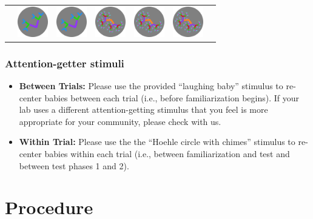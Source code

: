 \documentclass[
  letterpaper,
  DIV=11,
  numbers=noendperiod,
  oneside]{scrreprt}
\providecommand{\tightlist}{%
  \setlength{\itemsep}{0pt}\setlength{\parskip}{0pt}}
\begin{document}
\begin{longtable}[]{@{}lllllll@{}}
&
\includegraphics[width=\linewidth,height=0.52083in,keepaspectratio]{images/fractal-low.png}
&
\includegraphics[width=\linewidth,height=0.52083in,keepaspectratio]{images/fractal-low.png}
&
\includegraphics[width=\linewidth,height=0.52083in,keepaspectratio]{images/fractal-high.png}
&
\includegraphics[width=\linewidth,height=0.52083in,keepaspectratio]{images/fractal-high.png}
&
\includegraphics[width=\linewidth,height=0.52083in,keepaspectratio]{images/fractal-high.png} \\
\end{longtable}

\subsection{Attention-getter stimuli}\label{attention-getter-stimuli}

\begin{itemize}
\tightlist
\item
  \textbf{Between Trials:} Please use the provided ``laughing baby''
  stimulus to re-center babies between each trial (i.e., before
  familiarization begins). If your lab uses a different
  attention-getting stimulus that you feel is more appropriate for your
  community, please check with us.
\item
  \textbf{Within Trial:} Please use the the ``Hoehle circle with
  chimes'' stimulus to re-center babies within each trial (i.e., between
  familiarization and test and between test phases 1 and 2).
\end{itemize}

\chapter{Procedure}\label{sec-procedure}
\end{document}
